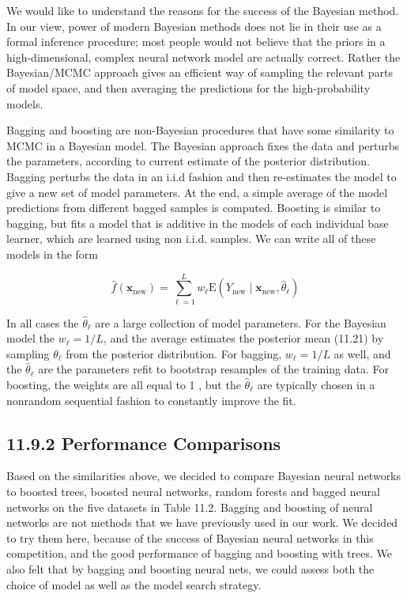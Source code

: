 \documentclass[10pt]{article}
\begin{document}
We would like to understand the reasons for the success of the Bayesian method. In our view, power of modern Bayesian methods does not lie in their use as a formal inference procedure; most people would not believe that the priors in a high-dimensional, complex neural network model are actually correct. Rather the Bayesian/MCMC approach gives an efficient way of sampling the relevant parts of model space, and then averaging the predictions for the high-probability models.

Bagging and boosting are non-Bayesian procedures that have some similarity to MCMC in a Bayesian model. The Bayesian approach fixes the data and perturbs the parameters, according to current estimate of the posterior distribution. Bagging perturbs the data in an i.i.d fashion and then re-estimates the model to give a new set of model parameters. At the end, a simple average of the model predictions from different bagged samples is computed. Boosting is similar to bagging, but fits a model that is additive in the models of each individual base learner, which are learned using non i.i.d. samples. We can write all of these models in the form


\begin{equation*}
\hat{f}\left(\mathbf{x}_{\mathrm{new}}\right)=\sum_{\ell=1}^{L} w_{\ell} \mathrm{E}\left(Y_{\mathrm{new}} \mid \mathbf{x}_{\mathrm{new}}, \hat{\theta}_{\ell}\right) \tag{11.21}
\end{equation*}


In all cases the $\hat{\theta}_{\ell}$ are a large collection of model parameters. For the Bayesian model the $w_{\ell}=1 / L$, and the average estimates the posterior mean (11.21) by sampling $\theta_{\ell}$ from the posterior distribution. For bagging, $w_{\ell}=1 / L$ as well, and the $\hat{\theta}_{\ell}$ are the parameters refit to bootstrap resamples of the training data. For boosting, the weights are all equal to 1 , but the $\hat{\theta}_{\ell}$ are typically chosen in a nonrandom sequential fashion to constantly improve the fit.

\subsection*{11.9.2 Performance Comparisons}
Based on the similarities above, we decided to compare Bayesian neural networks to boosted trees, boosted neural networks, random forests and bagged neural networks on the five datasets in Table 11.2. Bagging and boosting of neural networks are not methods that we have previously used in our work. We decided to try them here, because of the success of Bayesian neural networks in this competition, and the good performance of bagging and boosting with trees. We also felt that by bagging and boosting neural nets, we could assess both the choice of model as well as the model search strategy.
\end{document}

